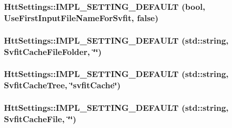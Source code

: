 \hypertarget{classHttSettings_a6f3eacd7b57c5cdec47fa3ad1cbb0173}{
\subsubsection[{IMPL\_\-SETTING\_\-DEFAULT}]{\setlength{\rightskip}{0pt plus 5cm}HttSettings::IMPL\_\-SETTING\_\-DEFAULT (bool, \/  UseFirstInputFileNameForSvfit, \/  false)}}
\label{classHttSettings_a6f3eacd7b57c5cdec47fa3ad1cbb0173}
\hypertarget{classHttSettings_a87ee236801590c12c57f609a1b9e0f9c}{
\subsubsection[{IMPL\_\-SETTING\_\-DEFAULT}]{\setlength{\rightskip}{0pt plus 5cm}HttSettings::IMPL\_\-SETTING\_\-DEFAULT (std::string, \/  SvfitCacheFileFolder, \/  \char`\"{}\char`\"{})}}
\label{classHttSettings_a87ee236801590c12c57f609a1b9e0f9c}
\hypertarget{classHttSettings_a3119e8f477ab24526676874edcfed7b3}{
\subsubsection[{IMPL\_\-SETTING\_\-DEFAULT}]{\setlength{\rightskip}{0pt plus 5cm}HttSettings::IMPL\_\-SETTING\_\-DEFAULT (std::string, \/  SvfitCacheTree, \/  \char`\"{}svfitCache\char`\"{})}}
\label{classHttSettings_a3119e8f477ab24526676874edcfed7b3}
\hypertarget{classHttSettings_a7fb46615968a14864b5d70d43c53f71d}{
\subsubsection[{IMPL\_\-SETTING\_\-DEFAULT}]{\setlength{\rightskip}{0pt plus 5cm}HttSettings::IMPL\_\-SETTING\_\-DEFAULT (std::string, \/  SvfitCacheFile, \/  \char`\"{}\char`\"{})}}
\label{classHttSettings_a7fb46615968a14864b5d70d43c53f71d}
